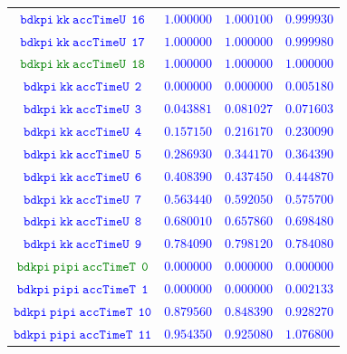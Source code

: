 \documentclass[10pt,a4paper]{article}
\begin{document}
\begin{table}[h!]
{\begin{tabular}{cccc}
\textcolor{blue}{$\mathtt{bdkpi~kk~accTimeU~~16}$} & \textcolor{blue}{$1.000000$}& \textcolor{blue}{$1.000100$}& \textcolor{blue}{$0.999930$}\\
\textcolor{blue}{$\mathtt{bdkpi~kk~accTimeU~~17}$} & \textcolor{blue}{$1.000000$}& \textcolor{blue}{$1.000000$}& \textcolor{blue}{$0.999980$}\\
\textcolor{Green}{$\mathtt{bdkpi~kk~accTimeU~~18}$} & \textcolor{blue}{$1.000000$}& \textcolor{blue}{$1.000000$}& \textcolor{blue}{$1.000000$}\\
\textcolor{blue}{$\mathtt{bdkpi~kk~accTimeU~~2}$} & \textcolor{blue}{$0.000000$}& \textcolor{blue}{$0.000000$}& \textcolor{blue}{$0.005180$}\\
\textcolor{blue}{$\mathtt{bdkpi~kk~accTimeU~~3}$} & \textcolor{blue}{$0.043881$}& \textcolor{blue}{$0.081027$}& \textcolor{blue}{$0.071603$}\\
\textcolor{blue}{$\mathtt{bdkpi~kk~accTimeU~~4}$} & \textcolor{blue}{$0.157150$}& \textcolor{blue}{$0.216170$}& \textcolor{blue}{$0.230090$}\\
\textcolor{blue}{$\mathtt{bdkpi~kk~accTimeU~~5}$} & \textcolor{blue}{$0.286930$}& \textcolor{blue}{$0.344170$}& \textcolor{blue}{$0.364390$}\\
\textcolor{blue}{$\mathtt{bdkpi~kk~accTimeU~~6}$} & \textcolor{blue}{$0.408390$}& \textcolor{blue}{$0.437450$}& \textcolor{blue}{$0.444870$}\\
\textcolor{blue}{$\mathtt{bdkpi~kk~accTimeU~~7}$} & \textcolor{blue}{$0.563440$}& \textcolor{blue}{$0.592050$}& \textcolor{blue}{$0.575700$}\\
\textcolor{blue}{$\mathtt{bdkpi~kk~accTimeU~~8}$} & \textcolor{blue}{$0.680010$}& \textcolor{blue}{$0.657860$}& \textcolor{blue}{$0.698480$}\\
\textcolor{blue}{$\mathtt{bdkpi~kk~accTimeU~~9}$} & \textcolor{blue}{$0.784090$}& \textcolor{blue}{$0.798120$}& \textcolor{blue}{$0.784080$}\\
\textcolor{Green}{$\mathtt{bdkpi~pipi~accTimeT~~0}$} & \textcolor{blue}{$0.000000$}& \textcolor{blue}{$0.000000$}& \textcolor{blue}{$0.000000$}\\
\textcolor{blue}{$\mathtt{bdkpi~pipi~accTimeT~~1}$} & \textcolor{blue}{$0.000000$}& \textcolor{blue}{$0.000000$}& \textcolor{blue}{$0.002133$}\\
\textcolor{blue}{$\mathtt{bdkpi~pipi~accTimeT~~10}$} & \textcolor{blue}{$0.879560$}& \textcolor{blue}{$0.848390$}& \textcolor{blue}{$0.928270$}\\
\textcolor{blue}{$\mathtt{bdkpi~pipi~accTimeT~~11}$} & \textcolor{blue}{$0.954350$}& \textcolor{blue}{$0.925080$}& \textcolor{blue}{$1.076800$}\\

\end{tabular}}
\end{table}
\end{document}
